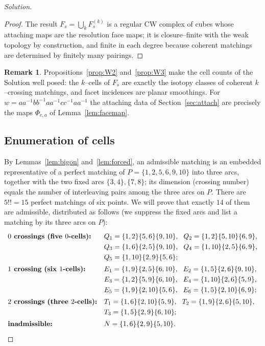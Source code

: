 \documentclass{amsart}
\theoremstyle{definition}
\newtheorem{remark}{Remark}
\begin{document}
\begin{proof}[Solution]
\begin{proof}
The result $F_s=\bigcup_k F_s^{(k)}$ is a regular CW complex of cubes whose attaching maps are the
resolution face maps; it is closure–finite with the weak topology by construction, and finite in
each degree because coherent matchings are determined by finitely many pairings.
\end{proof}

\begin{remark}
Propositions~\ref{prop:W2} and~\ref{prop:W3} make the cell counts of the Solution well posed: the
$k$–cells of $F_s$ are exactly the isotopy classes of coherent $k$–crossing matchings, and facet
incidences are planar smoothings. For $w=aa^{-1}bb^{-1}aa^{-1}cc^{-1}aa^{-1}$ the attaching data
of Section~\ref{sec:attach} are precisely the maps $\Phi_{c,a}$ of Lemma~\ref{lem:facemap}.
\end{remark}


\subsection{Enumeration of cells}\label{sec:enum}

By Lemmas~\ref{lem:bigon} and~\ref{lem:forced}, an admissible matching is an embedded
representative of a perfect matching of $P=\{1,2,5,6,9,10\}$ into three arcs, together with the
two fixed arcs $\{3,4\},\{7,8\}$; its dimension (crossing number) equals the number of
interleaving pairs among the three arcs on $P$. There are $5!!=15$ perfect matchings of six
points. We will prove that exactly $14$ of them are admissible, distributed as follows (we
suppress the fixed arcs and list a matching by its three arcs on $P$):
\begin{equation}\label{eq:list}
\renewcommand{\arraystretch}{1.25}
\begin{array}{l@{\quad}l}
\textbf{$0$ crossings (five $0$-cells):}
 & Q_1=\{1,2\}\{5,6\}\{9,10\},\ \ Q_2=\{1,2\}\{5,10\}\{6,9\},\\
 & Q_3=\{1,6\}\{2,5\}\{9,10\},\ \ Q_4=\{1,10\}\{2,5\}\{6,9\},\\
 & Q_5=\{1,10\}\{2,9\}\{5,6\};\\[2pt]
\textbf{$1$ crossing (six $1$-cells):}
 & E_1=\{1,9\}\{2,5\}\{6,10\},\ \ E_2=\{1,5\}\{2,6\}\{9,10\},\\
 & E_3=\{1,2\}\{5,9\}\{6,10\},\ \ E_4=\{1,10\}\{2,6\}\{5,9\},\\
 & E_5=\{1,9\}\{2,10\}\{5,6\},\ \ E_6=\{1,5\}\{2,10\}\{6,9\};\\[2pt]
\textbf{$2$ crossings (three $2$-cells):}
 & T_1=\{1,6\}\{2,10\}\{5,9\},\ \ T_2=\{1,9\}\{2,6\}\{5,10\},\\
 & T_3=\{1,5\}\{2,9\}\{6,10\};\\[2pt]
\textbf{inadmissible:} & N=\{1,6\}\{2,9\}\{5,10\}.
\end{array}
\end{equation}


\end{proof}
\end{document}
